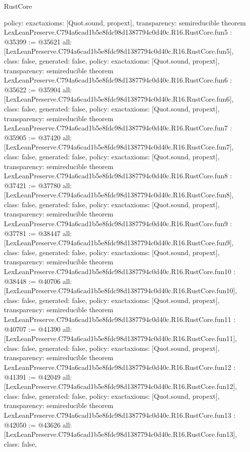 \begin{lexlean}{RustCore}
\begin{coremodule}
{  policy: exact{axioms: [Quot.sound, propext]},
  transparency: semireducible
}
theorem LexLeanPreserve.C794a6cad1b5e8fdc98d1387794c0d40c.R16.RustCore.fun5 : @35399 := @35621 {
  all: [LexLeanPreserve.C794a6cad1b5e8fdc98d1387794c0d40c.R16.RustCore.fun5],
  class: false,
  generated: false,
  policy: exact{axioms: [Quot.sound, propext]},
  transparency: semireducible
}
theorem LexLeanPreserve.C794a6cad1b5e8fdc98d1387794c0d40c.R16.RustCore.fun6 : @35622 := @35904 {
  all: [LexLeanPreserve.C794a6cad1b5e8fdc98d1387794c0d40c.R16.RustCore.fun6],
  class: false,
  generated: false,
  policy: exact{axioms: [Quot.sound, propext]},
  transparency: semireducible
}
theorem LexLeanPreserve.C794a6cad1b5e8fdc98d1387794c0d40c.R16.RustCore.fun7 : @35905 := @37420 {
  all: [LexLeanPreserve.C794a6cad1b5e8fdc98d1387794c0d40c.R16.RustCore.fun7],
  class: false,
  generated: false,
  policy: exact{axioms: [Quot.sound, propext]},
  transparency: semireducible
}
theorem LexLeanPreserve.C794a6cad1b5e8fdc98d1387794c0d40c.R16.RustCore.fun8 : @37421 := @37780 {
  all: [LexLeanPreserve.C794a6cad1b5e8fdc98d1387794c0d40c.R16.RustCore.fun8],
  class: false,
  generated: false,
  policy: exact{axioms: [Quot.sound, propext]},
  transparency: semireducible
}
theorem LexLeanPreserve.C794a6cad1b5e8fdc98d1387794c0d40c.R16.RustCore.fun9 : @37781 := @38447 {
  all: [LexLeanPreserve.C794a6cad1b5e8fdc98d1387794c0d40c.R16.RustCore.fun9],
  class: false,
  generated: false,
  policy: exact{axioms: [Quot.sound, propext]},
  transparency: semireducible
}
theorem LexLeanPreserve.C794a6cad1b5e8fdc98d1387794c0d40c.R16.RustCore.fun10 : @38448 := @40706 {
  all: [LexLeanPreserve.C794a6cad1b5e8fdc98d1387794c0d40c.R16.RustCore.fun10],
  class: false,
  generated: false,
  policy: exact{axioms: [Quot.sound, propext]},
  transparency: semireducible
}
theorem LexLeanPreserve.C794a6cad1b5e8fdc98d1387794c0d40c.R16.RustCore.fun11 : @40707 := @41390 {
  all: [LexLeanPreserve.C794a6cad1b5e8fdc98d1387794c0d40c.R16.RustCore.fun11],
  class: false,
  generated: false,
  policy: exact{axioms: [Quot.sound, propext]},
  transparency: semireducible
}
theorem LexLeanPreserve.C794a6cad1b5e8fdc98d1387794c0d40c.R16.RustCore.fun12 : @41391 := @42049 {
  all: [LexLeanPreserve.C794a6cad1b5e8fdc98d1387794c0d40c.R16.RustCore.fun12],
  class: false,
  generated: false,
  policy: exact{axioms: [Quot.sound, propext]},
  transparency: semireducible
}
theorem LexLeanPreserve.C794a6cad1b5e8fdc98d1387794c0d40c.R16.RustCore.fun13 : @42050 := @43626 {
  all: [LexLeanPreserve.C794a6cad1b5e8fdc98d1387794c0d40c.R16.RustCore.fun13],
  class: false,
}
\end{coremodule}
\end{lexlean}
